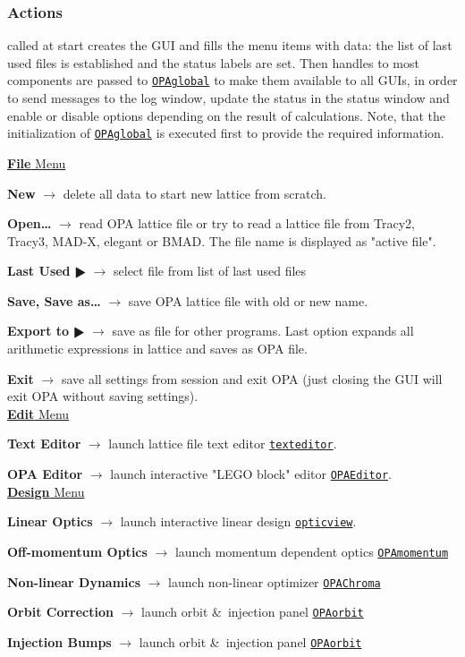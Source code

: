 \documentclass[12pt]{article}
\newcommand\code[1]{{\tt #1}}
\newcommand{\ofld}[1]{\colorbox{black!15}{{\bf #1}}}
\newcommand\guico[1]{{\color{blue}\code{#1}}}
\newcommand{\evcod}[2]{\ofld{#1} $\rightarrow$ \guico{#2}}
\newcommand{\opagui}[1]{\colorbox{blue!20}{\code{#1}}}
\newcommand{\ogui}[1]{\hyperref[#1]{\opagui{#1}}}
\newcommand{\opauni}[1]{\colorbox{orange!30}{\code{#1}}}
\newcommand{\ouni}[1]{\hyperref[#1]{\opauni{#1}}}
\newcommand{\act}[1]{\subsubsection*{Actions} #1}
\begin{document}
\act{
\guico{FormCreate} called at start creates the GUI and fills the menu items with data: the list of last used files is established and the status labels are set. Then handles to most components are passed to \ouni{OPAglobal} to make them available to all GUIs, in order to send messages to the log window, update the status in the status window and enable or disable options depending on the result of calculations.
Note, that the initialization of \ouni{OPAglobal} is executed first to provide the required information. 

\underline{\ofld{File} Menu}

\evcod{New}{fi\_new} delete all data to start new lattice from scratch.

\evcod{Open\dots}{fi\_open} read OPA lattice file or try to read a lattice  file from Tracy2, Tracy3, MAD-X, elegant or BMAD. The file name is displayed as "active file".

\evcod{Last Used $\RHD$}{fi\_last} select file from list of last used files

\evcod{Save, Save as\dots}{fi\_[save,svas]} save OPA lattice file with old or new name.

\evcod{Export to $\RHD$}{ex\_[tracy2,tracy,madx,elegant,bmad,opanovar]} save as file for other programs. Last option expands all arithmetic expressions in lattice and saves as OPA file.

\evcod{Exit}{fi\_exit} save all settings from session and exit OPA (just closing the GUI will exit OPA without saving settings).\\

\underline{\ofld{Edit} Menu}


\evcod{Text Editor}{ed\_text} launch lattice file text editor \ogui{texteditor}.

\evcod{OPA Editor}{ed\_oped} launch interactive "LEGO block" editor \ogui{OPAEditor}.\\

\underline{\ofld{Design} Menu}

\evcod{Linear Optics}{ds\_opti} launch interactive linear design \ogui{opticview}.

\evcod{Off-momentum Optics}{ds\_dppo}  launch momentum dependent optics \ogui{OPAmomentum}

\evcod{Non-linear Dynamics}{ds\_sext} launch non-linear optimizer \ogui{OPAChroma}

\evcod{Orbit Correction}{ds\_orbc} launch orbit \&\ injection panel \ogui{OPAorbit}

\evcod{Injection Bumps}{ds\_injc } launch orbit \&\ injection panel  \ogui{OPAorbit}

}
\end{document}
